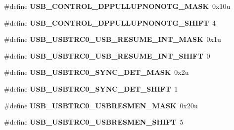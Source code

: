 \begin{DoxyCompactItemize}
\item 
\hypertarget{group___u_s_b___register___masks_ga764d9d972859eeded5e092a77eb4de79}{}\#define {\bfseries U\+S\+B\+\_\+\+C\+O\+N\+T\+R\+O\+L\+\_\+\+D\+P\+P\+U\+L\+L\+U\+P\+N\+O\+N\+O\+T\+G\+\_\+\+M\+A\+S\+K}~0x10u\label{group___u_s_b___register___masks_ga764d9d972859eeded5e092a77eb4de79}

\item 
\hypertarget{group___u_s_b___register___masks_ga5bae9683a5ae7c48617b8d24a35786ce}{}\#define {\bfseries U\+S\+B\+\_\+\+C\+O\+N\+T\+R\+O\+L\+\_\+\+D\+P\+P\+U\+L\+L\+U\+P\+N\+O\+N\+O\+T\+G\+\_\+\+S\+H\+I\+F\+T}~4\label{group___u_s_b___register___masks_ga5bae9683a5ae7c48617b8d24a35786ce}

\item 
\hypertarget{group___u_s_b___register___masks_ga9c943cc95fdf52fa40311292f2801518}{}\#define {\bfseries U\+S\+B\+\_\+\+U\+S\+B\+T\+R\+C0\+\_\+\+U\+S\+B\+\_\+\+R\+E\+S\+U\+M\+E\+\_\+\+I\+N\+T\+\_\+\+M\+A\+S\+K}~0x1u\label{group___u_s_b___register___masks_ga9c943cc95fdf52fa40311292f2801518}

\item 
\hypertarget{group___u_s_b___register___masks_ga48af1176ed5d811c299eb123f934425d}{}\#define {\bfseries U\+S\+B\+\_\+\+U\+S\+B\+T\+R\+C0\+\_\+\+U\+S\+B\+\_\+\+R\+E\+S\+U\+M\+E\+\_\+\+I\+N\+T\+\_\+\+S\+H\+I\+F\+T}~0\label{group___u_s_b___register___masks_ga48af1176ed5d811c299eb123f934425d}

\item 
\hypertarget{group___u_s_b___register___masks_ga2e2f3b4bb79885ed92d75c9f86d42e23}{}\#define {\bfseries U\+S\+B\+\_\+\+U\+S\+B\+T\+R\+C0\+\_\+\+S\+Y\+N\+C\+\_\+\+D\+E\+T\+\_\+\+M\+A\+S\+K}~0x2u\label{group___u_s_b___register___masks_ga2e2f3b4bb79885ed92d75c9f86d42e23}

\item 
\hypertarget{group___u_s_b___register___masks_ga986ea3386acad15ab845a8c5d9644c9e}{}\#define {\bfseries U\+S\+B\+\_\+\+U\+S\+B\+T\+R\+C0\+\_\+\+S\+Y\+N\+C\+\_\+\+D\+E\+T\+\_\+\+S\+H\+I\+F\+T}~1\label{group___u_s_b___register___masks_ga986ea3386acad15ab845a8c5d9644c9e}

\item 
\hypertarget{group___u_s_b___register___masks_gaf236b1fdfa7f7dab54961c74538dfb75}{}\#define {\bfseries U\+S\+B\+\_\+\+U\+S\+B\+T\+R\+C0\+\_\+\+U\+S\+B\+R\+E\+S\+M\+E\+N\+\_\+\+M\+A\+S\+K}~0x20u\label{group___u_s_b___register___masks_gaf236b1fdfa7f7dab54961c74538dfb75}

\item 
\hypertarget{group___u_s_b___register___masks_ga4b62f293769f60cae99319d6bb1299e8}{}\#define {\bfseries U\+S\+B\+\_\+\+U\+S\+B\+T\+R\+C0\+\_\+\+U\+S\+B\+R\+E\+S\+M\+E\+N\+\_\+\+S\+H\+I\+F\+T}~5\label{group___u_s_b___register___masks_ga4b62f293769f60cae99319d6bb1299e8}


\end{DoxyCompactItemize}
